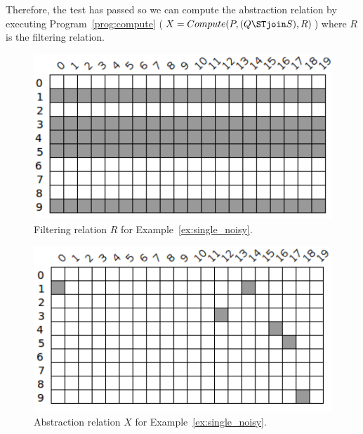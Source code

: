 \begin{example}
	Therefore, the test has passed so we can compute the abstraction relation by executing Program~\ref{prog:compute} ($X = Compute(P,(Q \STjoin S),R)$) where $R$ is the filtering relation. \newline

	\begin{figure}[ht]
		\centering
		\includegraphics[scale=0.65]{Figures/PDF/Relview/R.pdf}
		\caption{Filtering relation $R$ for Example~\ref{ex:single_noisy}.}
		\label{fig:single_noisy_r}
	\end{figure}

	\begin{figure}[ht]
		\centering
		\includegraphics[scale=0.65]{Figures/PDF/Relview/XNQ.pdf}
		\caption{Abstraction relation $X$ for Example~\ref{ex:single_noisy}.}
		\label{fig:single_noisy_x}
	\end{figure}

	\newpage
\end{example}